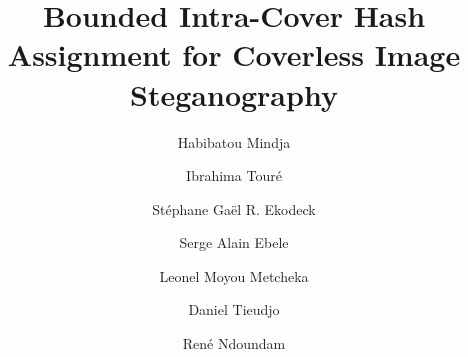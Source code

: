 \documentclass[preprint,12pt]{elsarticle}
\theoremstyle{plain}
\begin{document}
\begin{frontmatter}
\title{Bounded Intra-Cover Hash Assignment for Coverless Image Steganography}
\author[aff1]{Habibatou Mindja}
\author[aff2]{Ibrahima Tour\'e}
\author[aff1,aff4]{St\'ephane Ga\"el R. Ekodeck}
\author[aff1,aff4]{Serge Alain Ebele}
\author[aff1,aff4]{Leonel Moyou Metcheka}
\author[aff1]{Daniel Tieudjo}
\author[aff3,aff4]{Ren\'e Ndoundam}

\address[aff1]{University of Yaound\'e I, LIRIMA, Team GRIMCAPE, P.O. Box 812, Yaound\'e, Cameroon}

\address[aff2]{Institut Sup\'erieur des Technologies de Mamou, B.P. 063, Mamou, Republic of Guinea}

\address[aff3]{University of Bertoua, P.O. Box 416, Bertoua, Cameroon}


\end{frontmatter}
\end{document}

